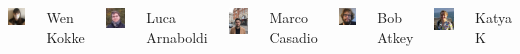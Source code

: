 \documentclass[aspectratio=169]{beamer}
\begin{document}
\begin{frame}
\begin{columns}
   \includegraphics[width=1.6cm]{Images/Wen.png}
   \begin{alertblock}{\footnotesize{Wen Kokke}}
   \end{alertblock}
    \includegraphics[width=1.8cm]{Images/Luca.jpeg}
    \begin{block}{\footnotesize{Luca Arnaboldi}}
   \end{block}
  \includegraphics[width=1.8cm]{Images/Marco.jpg}
        \begin{block}{\footnotesize{Marco Casadio}}
     \end{block}




     \includegraphics[width=1.6cm]{Images/Bob.jpeg}

          \begin{block}{\footnotesize{Bob Atkey}}
     \end{block}

\includegraphics[width=1.8cm]{Images/Katya3.jpg}
\begin{block}{\footnotesize{Katya K}}
   \end{block}



\end{columns}
\end{frame}
\end{document}
